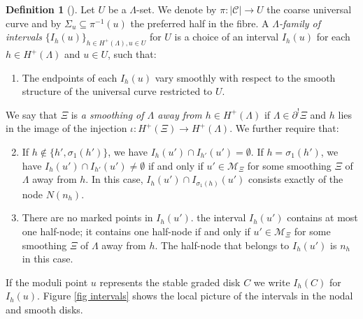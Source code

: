 \documentclass[11pt]{amsart}
\theoremstyle{definition}
\newtheorem{definition}[dummy]{Definition}
\theoremstyle{remark}
\newcommand{\<}{\left<}
\renewcommand{\>}{\right>}
\numberwithin{equation}{section}
\begin{document}
\begin{definition}[{\cite[Definition 3.4]{BCT2}}]
Let $U$ be a $\Lambda$-set. We denote by $\pi:\lvert\mathcal C\rvert\to U$ the coarse universal curve and by $\Sigma_u \subseteq \pi^{-1}(u)$ the preferred half in the fibre. A \textit{$\Lambda$-family of intervals} $\{I_{h}(u)\}_{h\in{H^+}(\Lambda),u\in U}$ for $U$ is a choice of an interval $I_{h}(u)$ for each $h\in{H^+}(\Lambda)$ and $u\in U$, such that:
\begin{enumerate}
\item
The endpoints of each $I_h(u)$ vary smoothly with respect to the smooth structure of the universal curve restricted to $U$.
\end{enumerate}
We say that $\Xi$ is \textit{a smoothing of $\Lambda$ away from $h\in H^+(\Lambda)$} if $\Lambda\in\partial^!\Xi$ and $h$ lies in the image of the injection $\iota:H^+(\Xi)\to H^+(\Lambda)$. We further require that:
\begin{enumerate}
\setcounter{enumi}{1}
\item
If $h \notin\{ h', \sigma_1(h')\}$, we have $I_h(u')\cap I_{h'}(u')=\emptyset$.  If $h=\sigma_1(h')$, we have $I_h(u')\cap I_{h'}(u')\neq\emptyset$ if and only if $u'\in{\mathcal M}_\Xi$ for some smoothing $\Xi$ of $\Lambda$ away from $h$.
  In this case, $I_h(u')\cap I_{\sigma_1(h)}(u')$ consists exactly of the node $N(n_{h})$.
\item There are no marked points in $I_h(u')$. the interval $I_h(u')$ contains at most one half-node; it contains one half-node if and only if $u'\in{\mathcal M}_\Xi$ for some smoothing $\Xi$ of $\Lambda$ away from $h$. The half-node that belongs to $I_h(u')$ is $n_{h}$ in this case.
\end{enumerate}

If the moduli point $u$ represents the stable graded disk $C$ we write $I_h(C)$ for $I_h(u).$ Figure \ref{fig intervals} shows the local picture of the intervals in the nodal and smooth disks.
\end{definition}
\end{document}
